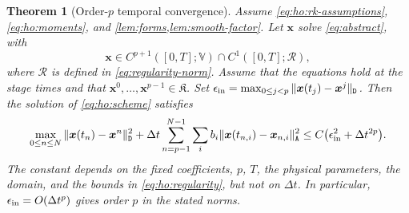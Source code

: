 \documentclass[11pt,a4paper]{article}
\newcommand{\bs}{\boldsymbol}
\newcommand{\dt}{\Delta t}
\newcommand{\V}{\mathbb V}
\newcommand{\DD}{\mathtt D}
\newcommand{\Aform}{\mathtt A}
\newtheorem{theorem}{Theorem}[section]
\theoremstyle{definition}
\numberwithin{equation}{section}
\begin{document}
\begin{theorem}[Order-$p$ temporal convergence]\label{thm:ho:convergence}
Assume \eqref{eq:ho:rk-assumptions}, \eqref{eq:ho:moments}, and
\cref{lem:forms,lem:smooth-factor}. Let $\bs x$ solve \eqref{eq:abstract}, with
\begin{equation}\label{eq:ho:regularity}
 \bs x\in C^{p+1}([0,T];\V)\cap C^1([0,T];\mathcal R),
\end{equation}
where $\mathcal R$ is defined in \eqref{eq:regularity-norm}. Assume that the
equations hold at the stage times and that
$\bs x^0,\ldots,\bs x^{p-1}\in\mathfrak K$. Set
$\epsilon_{\rm in}=\max_{0\le j<p}\|\bs x(t_j)-\bs x^j\|_{\DD}$.
Then the solution of \eqref{eq:ho:scheme} satisfies
\begin{equation}\label{eq:ho:global-error}
 \max_{0\le n\le N}\|\bs x(t_n)-\bs x^n\|_{\DD}^2
 +\dt\sum_{n=p-1}^{N-1}\sum_i b_i
       \|\bs x(t_{n,i})-\bs x_{n,i}\|_{\Aform}^2
 \le C\bigl(\epsilon_{\rm in}^2+\dt^{2p}\bigr).
\end{equation}
The constant depends on the fixed coefficients, $p$, $T$, the physical
parameters, the domain, and the bounds in \eqref{eq:ho:regularity}, but not on
$\dt$. In particular, $\epsilon_{\rm in}=O(\dt^p)$ gives order $p$ in the stated
norms. 
\end{theorem}
\end{document}
